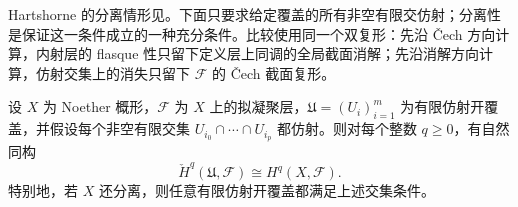 \ProseParagraphBreak
Hartshorne 的分离情形见\cite[Chapter III, Theorem 4.5, p. 222]{Hartshorne1977}。下面只要求给定覆盖的所有非空有限交仿射；分离性是保证这一条件成立的一种充分条件。比较使用同一个双复形：先沿 Čech 方向计算，内射层的 flasque 性只留下定义层上同调的全局截面消解；先沿消解方向计算，仿射交集上的消失只留下 \(\mathcal F\) 的 Čech 截面复形。

\begin{theorem}\label{b3:thm:affine-cech-comparison}
	设 \(X\) 为 Noether 概形，\(\mathcal F\) 为 \(X\) 上的拟凝聚层，\(\mathfrak U=(U_i)_{i=1}^m\) 为有限仿射开覆盖，并假设每个非空有限交集 \(U_{i_0}\cap\cdots\cap U_{i_p}\) 都仿射。则对每个整数 \(q\ge0\)，有自然同构
	\[
		\check H^q(\mathfrak U,\mathcal F)\cong H^q(X,\mathcal F).
	\]
	特别地，若 \(X\) 还分离，则任意有限仿射开覆盖都满足上述交集条件。
\end{theorem}
